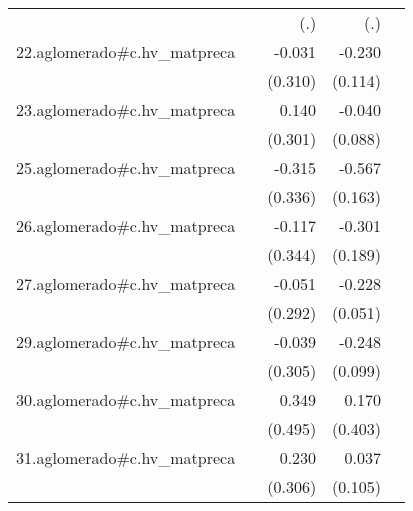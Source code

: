 {\begin{longtable}{l*{4}{D{.}{.}{-1}}}
            &                     &         (.)         &         (.)         &                     \\
\addlinespace
22.aglomerado#c.hv\_matpreca&                     &      -0.031         &      -0.230\sym{*}  &                     \\
            &                     &     (0.310)         &     (0.114)         &                     \\
\addlinespace
23.aglomerado#c.hv\_matpreca&                     &       0.140         &      -0.040         &                     \\
            &                     &     (0.301)         &     (0.088)         &                     \\
\addlinespace
25.aglomerado#c.hv\_matpreca&                     &      -0.315         &      -0.567\sym{***}&                     \\
            &                     &     (0.336)         &     (0.163)         &                     \\
\addlinespace
26.aglomerado#c.hv\_matpreca&                     &      -0.117         &      -0.301         &                     \\
            &                     &     (0.344)         &     (0.189)         &                     \\
\addlinespace
27.aglomerado#c.hv\_matpreca&                     &      -0.051         &      -0.228\sym{***}&                     \\
            &                     &     (0.292)         &     (0.051)         &                     \\
\addlinespace
29.aglomerado#c.hv\_matpreca&                     &      -0.039         &      -0.248\sym{*}  &                     \\
            &                     &     (0.305)         &     (0.099)         &                     \\
\addlinespace
30.aglomerado#c.hv\_matpreca&                     &       0.349         &       0.170         &                     \\
            &                     &     (0.495)         &     (0.403)         &                     \\
\addlinespace
31.aglomerado#c.hv\_matpreca&                     &       0.230         &       0.037         &                     \\
            &                     &     (0.306)         &     (0.105)         &                     \\

\end{longtable}}
